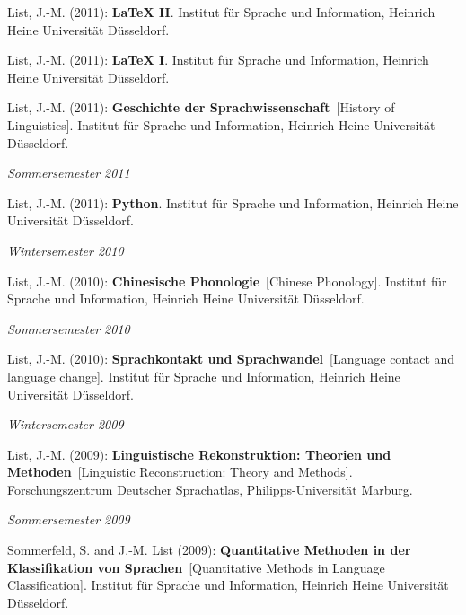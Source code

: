 \nopagebreak\noindent List, J.-M. (2011): \textbf{LaTeX II}. Institut für Sprache und Information, Heinrich Heine Universität Düsseldorf.\vspace{0.25cm}
\par
\nopagebreak\noindent List, J.-M. (2011): \textbf{LaTeX I}. Institut für Sprache und Information, Heinrich Heine Universität Düsseldorf.\vspace{0.25cm}
\par
\nopagebreak\noindent List, J.-M. (2011): \textbf{Geschichte der Sprachwissenschaft}\ [History of Linguistics]. Institut für Sprache und Information, Heinrich Heine Universität Düsseldorf.\vspace{0.25cm}
\par
\noindent\textit{Sommersemester 2011}\par\nopagebreak\vspace{0.25cm}
\nopagebreak\noindent List, J.-M. (2011): \textbf{Python}. Institut für Sprache und Information, Heinrich Heine Universität Düsseldorf.\vspace{0.25cm}
\par
\noindent\textit{Wintersemester 2010}\par\nopagebreak\vspace{0.25cm}
\nopagebreak\noindent List, J.-M. (2010): \textbf{Chinesische Phonologie}\ [Chinese Phonology]. Institut für Sprache und Information, Heinrich Heine Universität Düsseldorf.\vspace{0.25cm}
\par
\noindent\textit{Sommersemester 2010}\par\nopagebreak\vspace{0.25cm}
\nopagebreak\noindent List, J.-M. (2010): \textbf{Sprachkontakt und Sprachwandel}\ [Language contact and language change]. Institut für Sprache und Information, Heinrich Heine Universität Düsseldorf.\vspace{0.25cm}
\par
\noindent\textit{Wintersemester 2009}\par\nopagebreak\vspace{0.25cm}
\nopagebreak\noindent List, J.-M. (2009): \textbf{Linguistische Rekonstruktion: Theorien und Methoden}\ [Linguistic Reconstruction: Theory and Methods]. Forschungszentrum Deutscher Sprachatlas, Philipps-Universität Marburg.\vspace{0.25cm}
\par
\noindent\textit{Sommersemester 2009}\par\nopagebreak\vspace{0.25cm}
\nopagebreak\noindent Sommerfeld, S. and J.-M. List (2009): \textbf{Quantitative Methoden in der Klassifikation von Sprachen}\ [Quantitative Methods in Language Classification]. Institut für Sprache und Information, Heinrich Heine Universität Düsseldorf.\vspace{0.25cm}
\par
